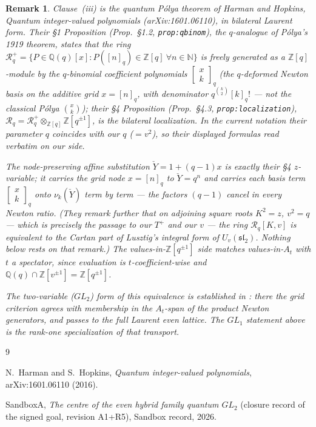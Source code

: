 \documentclass[11pt]{article}
\newtheorem{remark}{Remark}
\newcommand{\At}{A_t}
\newcommand{\Yc}{\check Y}
\newcommand{\Z}{\mathbb Z}
\begin{document}
\begin{remark}
Clause~(iii) is the quantum P\'olya theorem of Harman and Hopkins,
\emph{Quantum integer-valued polynomials} (arXiv:1601.06110), in bilateral
Laurent form. Their \S1 Proposition (Prop.~\S1.2, \texttt{prop:qbinom}), the
$q$-analogue of P\'olya's 1919 theorem, states that the ring
$\mathcal R_q^{+}=\{P\in\mathbb Q(q)[x]:P([n]_q)\in\Z[q]\ \forall n\in\mathbb N\}$
is freely generated as a $\Z[q]$-module by the $q$-binomial coefficient
polynomials $\begin{bmatrix}x\\k\end{bmatrix}_{q}$ (the $q$-deformed Newton
basis on the \emph{additive} grid $x=[n]_q$, with denominator
$q^{\binom{k}{2}}[k]_q!$ --- not the classical P\'olya $\binom{x}{k}$); their \S4
Proposition (Prop.~\S4.3, \texttt{prop:localization}),
$\mathcal R_q=\mathcal R_q^{+}\otimes_{\Z[q]}\Z[q^{\pm1}]$, is the bilateral
localization. In the current notation their parameter $q$ coincides with our
$q$ ($=v^{2}$), so their displayed formulas read verbatim on our side.

The node-preserving affine substitution $\Yc=1+(q-1)x$ is exactly their \S4
$z$-variable; it carries the grid node $x=[n]_q$ to $\Yc=q^{n}$ and carries each
basis term $\begin{bmatrix}x\\k\end{bmatrix}_{q}$ onto $\nu_k(\Yc)$ \emph{term by
term} --- the factors $(q-1)$ cancel in every Newton ratio. (They remark further
that on adjoining square roots $K^{2}=z$, $v^{2}=q$ --- which is precisely the
passage to our $T^{+}$ and our $v$ --- the ring $\mathcal R_q[K,v]$ is equivalent
to the Cartan part of Lusztig's integral form of $U_v(\mathfrak{sl}_2)$. Nothing
below rests on that remark.) The values-in-$\Z[q^{\pm1}]$
side matches values-in-$\At$ with $t$ a spectator, since evaluation is
$t$-coefficient-wise and $\mathbb Q(q)\cap\Z[v^{\pm1}]=\Z[q^{\pm1}]$.

The two-variable ($GL_2$) form of this equivalence is established in
\cite{SandboxGL2}: there the grid criterion agrees with membership in the
$\At$-span of the product Newton generators, and passes to the full Laurent
even lattice. The $GL_1$ statement above is the rank-one specialization of
that transport.
\end{remark}

\begin{thebibliography}{9}

N.~Harman and S.~Hopkins,
\emph{Quantum integer-valued polynomials},
arXiv:1601.06110 (2016).

SandboxA,
\emph{The centre of the even hybrid family quantum $GL_2$}
(closure record of the signed goal, revision A1+R5),
Sandbox record, 2026.

\end{thebibliography}
\end{document}
